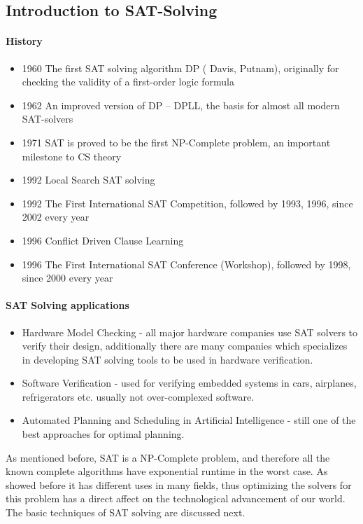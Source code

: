 \documentclass[]{article}
\begin{document}
\subsection{Introduction to SAT-Solving}
	\paragraph{History}
	\begin{itemize}
		\item 1960 The first SAT solving algorithm DP ( Davis, Putnam), originally for checking the validity of a first-order logic formula
		\item 1962 An improved version of DP – DPLL, the basis for almost all modern SAT-solvers
		\item 1971 SAT is proved to be the first NP-Complete problem, an important milestone to CS theory
		\item 1992 Local Search SAT solving
		\item 1992 The First International SAT Competition, followed by 1993, 1996, since 2002 every year
		\item 1996 Conflict Driven Clause Learning
		\item 1996 The First International SAT Conference (Workshop), followed by 1998, since 2000 every year
	\end{itemize}

	\paragraph{SAT Solving applications}
	\begin{itemize}
		\item Hardware Model Checking - all major hardware companies use SAT solvers to verify their design, additionally there are many companies which specializes in developing SAT solving tools to be used in hardware verification.
		\item Software Verification - used for verifying embedded systems in cars, airplanes, refrigerators etc. usually not over-complexed software.
		\item Automated Planning and Scheduling in Artificial Intelligence - still one of the best approaches for optimal planning.
	\end{itemize}

	As mentioned before, SAT is a NP-Complete problem, and therefore all the known complete algorithms have exponential runtime in the worst case. As showed before it has different uses in many fields, thus optimizing the solvers for this problem has a direct affect on the technological advancement of our world. The basic techniques of SAT solving are discussed next.
	\pagebreak
\end{document}
